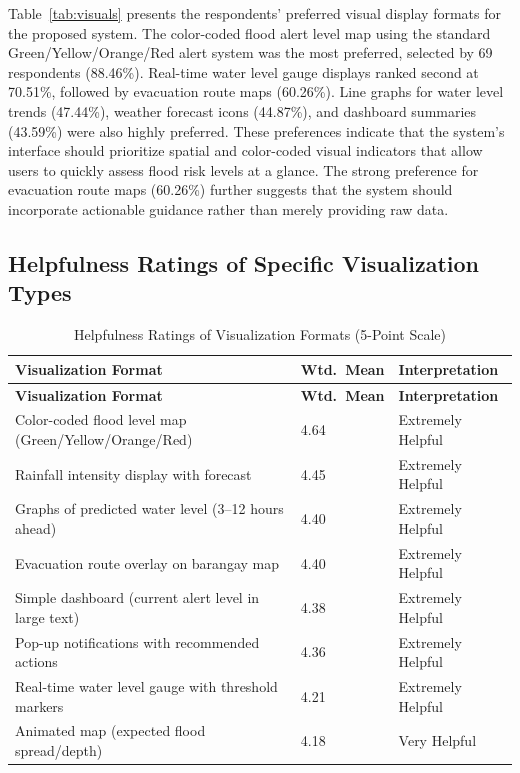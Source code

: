 \documentclass{research}
\begin{document}
Table~\ref{tab:visuals} presents the respondents' preferred visual display formats for the
proposed system. The color-coded flood alert level map using the standard
Green/Yellow/Orange/Red alert system was the most preferred, selected by 69
respondents (88.46\%). Real-time water level gauge displays ranked second at 70.51\%,
followed by evacuation route maps (60.26\%). Line graphs for water level trends
(47.44\%), weather forecast icons (44.87\%), and dashboard summaries (43.59\%) were
also highly preferred. These preferences indicate that the system's interface should
prioritize spatial and color-coded visual indicators that allow users to quickly assess
flood risk levels at a glance. The strong preference for evacuation route maps (60.26\%)
further suggests that the system should incorporate actionable guidance rather than
merely providing raw data.
 
\subsection{Helpfulness Ratings of Specific Visualization Types}
 
\begin{longtable}{p{9.8cm}|p{1.4cm}|p{2.8cm}}
\caption{Helpfulness Ratings of Visualization Formats (5-Point Scale)}
\label{tab:helpfulness} \\
\hline
\textbf{Visualization Format} & \textbf{Wtd.\ Mean} & \textbf{Interpretation} \\
\hline
\endfirsthead
\hline
\textbf{Visualization Format} & \textbf{Wtd.\ Mean} & \textbf{Interpretation} \\
\hline
\endhead
\hline
\endfoot
Color-coded flood level map (Green/Yellow/Orange/Red)
  & 4.64 & Extremely Helpful \\[3pt]
Rainfall intensity display with forecast
  & 4.45 & Extremely Helpful \\[3pt]
Graphs of predicted water level (3--12 hours ahead)
  & 4.40 & Extremely Helpful \\[3pt]
Evacuation route overlay on barangay map
  & 4.40 & Extremely Helpful \\[3pt]
Simple dashboard (current alert level in large text)
  & 4.38 & Extremely Helpful \\[3pt]
Pop-up notifications with recommended actions
  & 4.36 & Extremely Helpful \\[3pt]
Real-time water level gauge with threshold markers
  & 4.21 & Extremely Helpful \\[3pt]
Animated map (expected flood spread/depth)
  & 4.18 & Very Helpful \\
\hline
\end{longtable}
\end{document}
